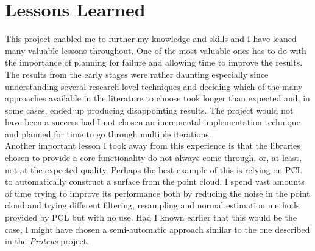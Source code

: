 \documentclass[12pt,a4paper,twoside,openright]{report}
\begin{document}
\section{Lessons Learned}
This project enabled me to further my knowledge and skills and I have leaned many valuable lessons throughout. One of the most valuable ones has to do with the importance of planning for failure and allowing time to improve the results. The results from the early stages were rather daunting especially since understanding several research-level techniques and deciding which of the many approaches available in the literature to choose took longer than expected and, in some cases, ended up producing disappointing results. The project would not have been a success had I not chosen an incremental implementation technique and planned for time to go through multiple iterations.\\
\linebreak
Another important lesson I took away from this experience is that the libraries chosen to provide a core functionality do not always come through, or, at least,  not at the expected quality. Perhaps the best example of this is relying on PCL to automatically construct a surface from the point cloud. I spend vast amounts of time trying to improve its performance both by reducing the noise in the point cloud and trying different filtering, resampling and normal estimation methods provided by PCL but with no use. Had I known earlier that this would be the case, I might have chosen a semi-automatic approach similar to the one described in the \emph{Proteus}\cite{ProteusInteractiveSFM} project.
\end{document}
